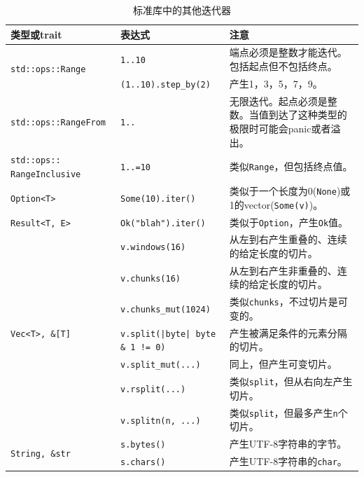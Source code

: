 \begin{longtable}{p{}p{}p{}}
    \caption{标准库中的其他迭代器}
    \label{t15-1}\\
    \hline
    \textbf{类型或trait} & \textbf{表达式} & \textbf{注意} \\
    \hline
    \multirow{2}{*}{\texttt{std::ops::Range}} & \texttt{1..10} & 端点必须是整数才能迭代。包括起点但不包括终点。 \\
    & \texttt{(1..10).step\_by(2)} \cellcolor{tablecolor} & 产生1，3，5，7，9。 \cellcolor{tablecolor} \\
    \hline
    \texttt{std::ops::RangeFrom} & \texttt{1..} & 无限迭代。起点必须是整数。当值到达了这种类型的极限时可能会panic或者溢出。 \\
    \hline
    \rowcolor{tablecolor}
    \texttt{std::ops:: RangeInclusive} & \texttt{1..=10} & 类似\texttt{Range}，但包括终点值。 \\
    \hline
    \texttt{Option<T>} & \texttt{Some(10).iter()} & 类似于一个长度为0(\texttt{None})或1的vector(\texttt{Some(v)})。 \\
    \hline
    \rowcolor{tablecolor}
    \texttt{Result<T, E>} & \texttt{Ok("blah").iter()} & 类似于\texttt{Option}，产生\texttt{Ok}值。 \\
    \hline
    \multirow{7}{*}{\texttt{Vec<T>, \&[T]}} & \texttt{v.windows(16)} & 从左到右产生重叠的、连续的给定长度的切片。 \\
    & \texttt{v.chunks(16)} \cellcolor{tablecolor} & 从左到右产生非重叠的、连续的给定长度的切片。 \cellcolor{tablecolor} \\
    & \texttt{v.chunks\_mut(1024)} & 类似\texttt{chunks}，不过切片是可变的。 \\
    & \texttt{v.split(|byte| byte \& 1 != 0)} \cellcolor{tablecolor} & 产生被满足条件的元素分隔的切片。 \cellcolor{tablecolor} \\
    & \texttt{v.split\_mut(...)} & 同上，但产生可变切片。 \\
    & \texttt{v.rsplit(...)} \cellcolor{tablecolor} & 类似\texttt{split}，但从右向左产生切片。 \cellcolor{tablecolor} \\
    & \texttt{v.splitn(n, ...)} & 类似\texttt{split}，但最多产生\texttt{n}个切片。 \\
    \hline
    \multirow{5}{*}{\texttt{String, \&str}} & \texttt{s.bytes()} \cellcolor{tablecolor} & 产生UTF-8字符串的字节。 \cellcolor{tablecolor} \\
    & \texttt{s.chars()} & 产生UTF-8字符串的\texttt{char}。 \\

\end{longtable}
